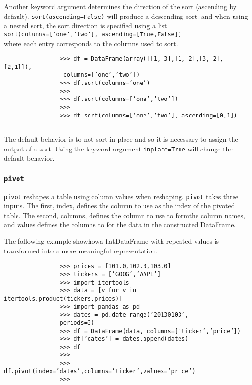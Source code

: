 \documentclass[KSmain.tex]{subfiles}
\begin{document}
			\noindent Another
			keyword argument determines the direction of the sort (ascending by default). \texttt{sort(ascending=False)}
			will produce a descending sort, and when using a nested sort, the sort direction is specified using a list \\
			\texttt{sort(columns=[’one’,’two’], ascending=[True,False])} \\ where each entry corresponds to the columns
			used to sort.
			\begin{framed}
				\begin{verbatim}
				>>> df = DataFrame(array([[1, 3],[1, 2],[3, 2],[2,1]]),
				 columns=[’one’,’two’])
				>>> df.sort(columns=’one’)
				>>>
				>>> df.sort(columns=[’one’,’two’])
				>>>
				>>> df.sort(columns=[’one’,’two’], ascending=[0,1])
				
				\end{verbatim}
			\end{framed}
			The default behavior is to not sort in-place and so it is necessary to assign the output of a sort. Using the
			keyword argument \texttt{inplace=True} will change the default behavior.
			\subsubsection*{\texttt{pivot}}
			\texttt{pivot} reshapes a table using column values when reshaping. \texttt{pivot} takes three inputs. The first, index, defines
			the column to use as the index of the pivoted table. The second, columns, defines the column to use
			to formthe column names, and values defines the columns to for the data in the constructed DataFrame.
			
			\noindent
			The following example showhowa flatDataFrame with repeated values is transformed into a more meaningful
			representation.
			\begin{framed}
				\begin{verbatim}
				>>> prices = [101.0,102.0,103.0]
				>>> tickers = [’GOOG’,’AAPL’]
				>>> import itertools
				>>> data = [v for v in itertools.product(tickers,prices)]
				>>> import pandas as pd
				>>> dates = pd.date_range(’20130103’,
				periods=3)
				>>> df = DataFrame(data, columns=[’ticker’,’price’])
				>>> df[’dates’] = dates.append(dates)
				>>> df
				>>>
				>>> df.pivot(index=’dates’,columns=’ticker’,values=’price’)
				>>>
				\end{verbatim}
			\end{framed}
		
\end{document}
